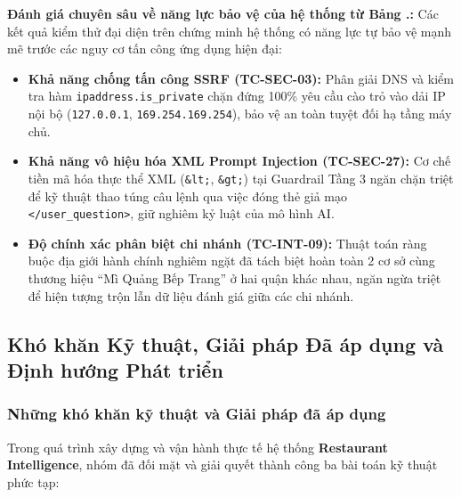 \documentclass[12pt, a4paper]{article}
\renewcommand{\thetable}{\arabic{section}.\arabic{table}}
\begin{document}
\textbf{Đánh giá chuyên sâu về năng lực bảo vệ của hệ thống từ Bảng \thetable:}
Các kết quả kiểm thử đại diện trên chứng minh hệ thống có năng lực tự bảo vệ mạnh mẽ trước các nguy cơ tấn công ứng dụng hiện đại:
\begin{itemize}[leftmargin=0.8cm, itemsep=2pt, parsep=0pt, topsep=2pt]
    \item \textbf{Khả năng chống tấn công SSRF (TC-SEC-03):} Phân giải DNS và kiểm tra hàm \texttt{ipaddress.is\_private} chặn đứng 100\% yêu cầu cào trỏ vào dải IP nội bộ (\texttt{127.0.0.1}, \texttt{169.254.169.254}), bảo vệ an toàn tuyệt đối hạ tầng máy chủ.
    \item \textbf{Khả năng vô hiệu hóa XML Prompt Injection (TC-SEC-27):} Cơ chế tiền mã hóa thực thể XML (\texttt{\&lt;}, \texttt{\&gt;}) tại Guardrail Tầng 3 ngăn chặn triệt để kỹ thuật thao túng câu lệnh qua việc đóng thẻ giả mạo \texttt{</user\_question>}, giữ nghiêm kỷ luật của mô hình AI.
    \item \textbf{Độ chính xác phân biệt chi nhánh (TC-INT-09):} Thuật toán ràng buộc địa giới hành chính nghiêm ngặt đã tách biệt hoàn toàn 2 cơ sở cùng thương hiệu ``Mì Quảng Bếp Trang'' ở hai quận khác nhau, ngăn ngừa triệt để hiện tượng trộn lẫn dữ liệu đánh giá giữa các chi nhánh.
\end{itemize}

\newpage
\subsection{Khó khăn Kỹ thuật, Giải pháp Đã áp dụng và Định hướng Phát triển}

\subsubsection{Những khó khăn kỹ thuật và Giải pháp đã áp dụng}
Trong quá trình xây dựng và vận hành thực tế hệ thống \textbf{Restaurant Intelligence}, nhóm đã đối mặt và giải quyết thành công ba bài toán kỹ thuật phức tạp:
\end{document}
